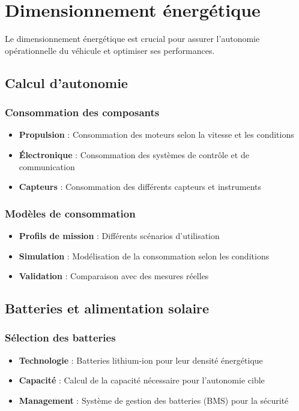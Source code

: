 {\section{Dimensionnement énergétique}
Le dimensionnement énergétique est crucial pour assurer l'autonomie opérationnelle du véhicule et optimiser ses performances.

\subsection{Calcul d'autonomie}
\subsubsection{Consommation des composants}
\begin{itemize}
    \item \textbf{Propulsion} : Consommation des moteurs selon la vitesse et les conditions
    \item \textbf{Électronique} : Consommation des systèmes de contrôle et de communication
    \item \textbf{Capteurs} : Consommation des différents capteurs et instruments
\end{itemize}

\subsubsection{Modèles de consommation}
\begin{itemize}
    \item \textbf{Profils de mission} : Différents scénarios d'utilisation
    \item \textbf{Simulation} : Modélisation de la consommation selon les conditions
    \item \textbf{Validation} : Comparaison avec des mesures réelles
\end{itemize}

\subsection{Batteries et alimentation solaire}
\subsubsection{Sélection des batteries}
\begin{itemize}
    \item \textbf{Technologie} : Batteries lithium-ion pour leur densité énergétique
    \item \textbf{Capacité} : Calcul de la capacité nécessaire pour l'autonomie cible
    \item \textbf{Management} : Système de gestion des batteries (BMS) pour la sécurité
\end{itemize}

}
